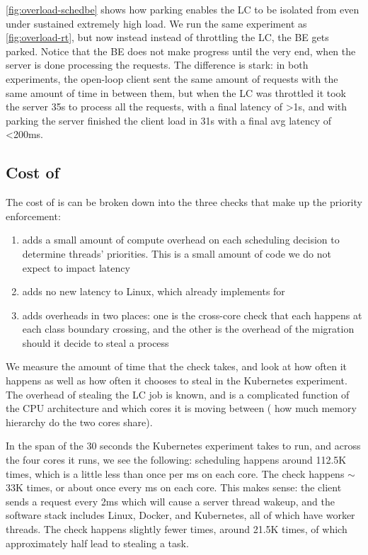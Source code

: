 \autoref{fig:overload-schedbe} shows how parking enables the LC to be isolated
from \schedbe{} even under sustained extremely high load. We run the same
experiment as \autoref{fig:overload-rt}, but now instead instead of throttling
the LC, the BE gets parked. Notice that the BE does not make progress until the
very end, when the server is done processing the requests. The difference is
stark: in both experiments, the open-loop client sent the same amount of
requests with the same amount of time in between them, but when the LC was
throttled it took the server 35s to process all the requests, with a final
latency of >1s, and with parking the server finished the client load in 31s with
a final avg latency of <200ms. 



\subsection{Cost of \schedbe{}}

The cost of \schedbe{} is can be broken down into the three checks that make up
the priority enforcement:

\begin{enumerate}
    \item \local{} adds a small amount of compute overhead on each scheduling
    decision to determine threads' priorities. This is a small amount of code we
    do not expect to impact latency
    \item \entry{} adds no new latency to Linux, which already implements
    \entry{} for \schedidle{}
    \item \exit{} adds overheads in two places: one is the cross-core check that
    each happens at each class boundary crossing, and the other is the overhead
    of the migration should it decide to steal a \schednormal{} process
\end{enumerate}

We measure the amount of time that the \exit{} check takes, and look at how
often it happens as well as how often it chooses to steal in the Kubernetes
experiment. The overhead of stealing the LC job is known, and is a complicated
function of the CPU architecture and which cores it is moving between (\eg{} how
much memory hierarchy do the two cores share).

In the span of the 30 seconds the Kubernetes experiment takes to run, and across
the four cores it runs, we see the following: scheduling happens around 112.5K
times, which is a little less than once per ms on each core. The \entry{} check
happens $\sim$33K times, or about once every ms on each core. This makes sense:
the client sends a request every 2ms which will cause a server thread wakeup,
and the software stack includes Linux, Docker, and Kubernetes, all of which have
worker threads. The \exit{} check happens slightly fewer times, around 21.5K
times, of which approximately half lead to stealing a \schednormal{} task.

